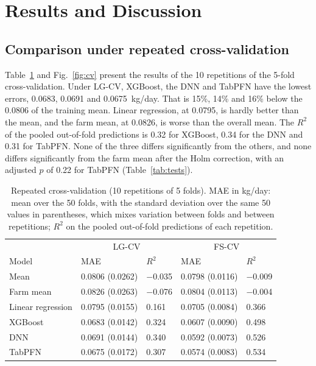 \documentclass[12pt]{article}
\begin{document}
\section{Results and Discussion}

\subsection{Comparison under repeated cross-validation}

Table~\ref{tab:cv} and Fig.~\ref{fig:cv} present the results of the 10 repetitions of the 5-fold cross-validation. Under LG-CV, XGBoost, the DNN and TabPFN have the lowest errors, 0.0683, 0.0691 and 0.0675~kg/day. That is 15\%, 14\% and 16\% below the 0.0806 of the training mean. Linear regression, at 0.0795, is hardly better than the mean, and the farm mean, at 0.0826, is worse than the overall mean. The $R^2$ of the pooled out-of-fold predictions is 0.32 for XGBoost, 0.34 for the DNN and 0.31 for TabPFN. None of the three differs significantly from the others, and none differs significantly from the farm mean after the Holm correction, with an adjusted $p$ of 0.22 for TabPFN (Table~\ref{tab:tests}).

\begin{table}[!htbp]
\caption{Repeated cross-validation (10 repetitions of 5 folds). MAE in kg/day: mean over the 50 folds, with the standard deviation over the same 50 values in parentheses, which mixes variation between folds and between repetitions; $R^2$ on the pooled out-of-fold predictions of each repetition.}\label{tab:cv}
\begin{tabular}{p{3.6cm}p{3.1cm}p{1.5cm}p{3.1cm}p{1.5cm}}
\hline
 & \multicolumn{2}{c}{LG-CV} & \multicolumn{2}{c}{FS-CV}\\
Model & MAE & $R^2$ & MAE & $R^2$\\
\hline
Mean & 0.0806 (0.0262) & $-$0.035 & 0.0798 (0.0116) & $-$0.009\\
Farm mean & 0.0826 (0.0263) & $-$0.076 & 0.0804 (0.0113) & $-$0.004\\
Linear regression & 0.0795 (0.0155) & 0.161 & 0.0705 (0.0084) & 0.366\\
XGBoost & 0.0683 (0.0142) & 0.324 & 0.0607 (0.0090) & 0.498\\
DNN & 0.0691 (0.0144) & 0.340 & 0.0592 (0.0073) & 0.526\\
TabPFN & 0.0675 (0.0172) & 0.307 & 0.0574 (0.0083) & 0.534\\
\hline
\end{tabular}
\end{table}
\end{document}
